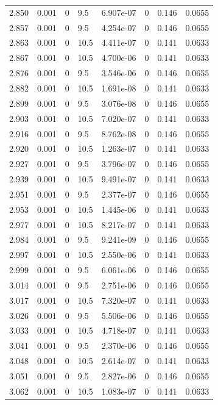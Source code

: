 \documentclass[preview]{standalone}
\begin{document}
{{{{{{{{{\begin{tabular}{L{1.2cm}C{1.2cm} C{0.3cm}C{0.5cm} C{1.4cm}C{1.4cm} C{1.4cm}C{1.4cm}}
  2.850  &  0.001  & 0     & 9.5 &  6.907e-07  & 0  & 0.146 &  0.0655   \\ 
  2.857  &  0.001  & 0     & 9.5 &  4.254e-07  & 0  & 0.146 &  0.0655   \\ 
  2.863  &  0.001  & 0     & 10.5 &  4.411e-07  & 0  & 0.141 &  0.0633   \\ 
  2.867  &  0.001  & 0     & 10.5 &  4.700e-06  & 0  & 0.141 &  0.0633   \\ 
  2.876  &  0.001  & 0     & 9.5 &  3.546e-06  & 0  & 0.146 &  0.0655   \\ 
  2.882  &  0.001  & 0     & 10.5 &  1.691e-08  & 0  & 0.141 &  0.0633   \\ 
  2.899  &  0.001  & 0     & 9.5 &  3.076e-08  & 0  & 0.146 &  0.0655   \\ 
  2.903  &  0.001  & 0     & 10.5 &  7.020e-07  & 0  & 0.141 &  0.0633   \\ 
  2.916  &  0.001  & 0     & 9.5 &  8.762e-08  & 0  & 0.146 &  0.0655   \\ 
  2.920  &  0.001  & 0     & 10.5 &  1.263e-07  & 0  & 0.141 &  0.0633   \\ 
  2.927  &  0.001  & 0     & 9.5 &  3.796e-07  & 0  & 0.146 &  0.0655   \\ 
  2.939  &  0.001  & 0     & 10.5 &  9.491e-07  & 0  & 0.141 &  0.0633   \\ 
  2.951  &  0.001  & 0     & 9.5 &  2.377e-07  & 0  & 0.146 &  0.0655   \\ 
  2.953  &  0.001  & 0     & 10.5 &  1.445e-06  & 0  & 0.141 &  0.0633   \\ 
  2.977  &  0.001  & 0     & 10.5 &  8.217e-07  & 0  & 0.141 &  0.0633   \\ 
  2.984  &  0.001  & 0     & 9.5 &  9.241e-09  & 0  & 0.146 &  0.0655   \\ 
  2.997  &  0.001  & 0     & 10.5 &  2.550e-06  & 0  & 0.141 &  0.0633   \\ 
  2.999  &  0.001  & 0     & 9.5 &  6.061e-06  & 0  & 0.146 &  0.0655   \\ 
  3.014  &  0.001  & 0     & 9.5 &  2.751e-06  & 0  & 0.146 &  0.0655   \\ 
  3.017  &  0.001  & 0     & 10.5 &  7.320e-07  & 0  & 0.141 &  0.0633   \\ 
  3.026  &  0.001  & 0     & 9.5 &  5.506e-06  & 0  & 0.146 &  0.0655   \\ 
  3.033  &  0.001  & 0     & 10.5 &  4.718e-07  & 0  & 0.141 &  0.0633   \\ 
  3.041  &  0.001  & 0     & 9.5 &  2.370e-06  & 0  & 0.146 &  0.0655   \\ 
  3.048  &  0.001  & 0     & 10.5 &  2.614e-07  & 0  & 0.141 &  0.0633   \\ 
  3.051  &  0.001  & 0     & 9.5 &  2.827e-06  & 0  & 0.146 &  0.0655   \\ 
  3.062  &  0.001  & 0     & 10.5 &  1.083e-07  & 0  & 0.141 &  0.0633   \\ 
\hline 
\end{tabular} 

}}}}}}}}}
\end{document}
